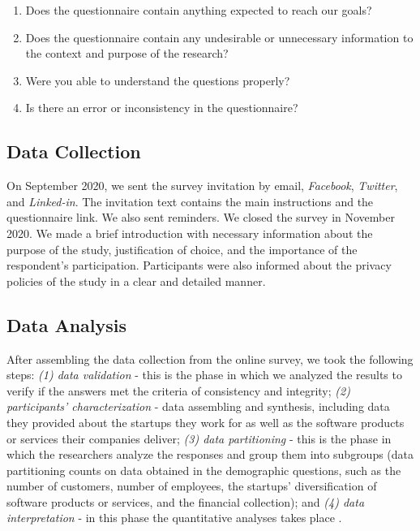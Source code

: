 \documentclass[runningheads]{llncs}
\begin{document}
\begin{enumerate}
\item Does the questionnaire contain anything expected to reach our goals?
\item Does the questionnaire contain any undesirable or unnecessary information to the context and purpose of the research?
\item Were you able to understand the questions properly?
\item Is there an error or inconsistency in the questionnaire?
\end{enumerate}


\subsection{Data Collection}%
\label{subsection:distributing}

On September 2020, we sent the survey invitation by email, \textit{Facebook}, \textit{Twitter}, and \textit{Linked-in}. The invitation text contains the main instructions and the questionnaire link. We also sent reminders. We closed the survey in November 2020. We made a brief introduction with necessary information about the purpose of the study, justification of choice, and the importance of the respondent's participation. Participants were also informed about the privacy policies of the study in a clear and detailed manner.


\subsection{Data Analysis}
\label{subsection:analizing}

After assembling the data collection from the online survey, we took the following steps: \textit{(1) data validation} - this is the phase in which we analyzed the results to verify if the answers met the criteria of consistency and integrity; \textit{(2) participants' characterization} - data assembling and synthesis, including data they provided about the startups they work for as well as the software products or services their companies deliver; \textit{(3) data partitioning} - this is the phase in which the researchers analyze the responses and group them into subgroups (data partitioning counts on data obtained in the demographic questions, such as the number of customers, number of employees, the startups' diversification of software products or services, and the financial collection); and \textit{(4) data interpretation} - in this phase the quantitative analyses takes place \cite{Kitchenham2002}.
\end{document}
